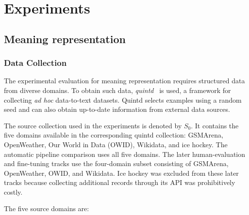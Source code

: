 
\chapter{Experiments}

\section{Meaning representation}

\subsection{Data Collection}

The experimental evaluation for meaning representation requires structured data
from diverse domains. To obtain such data, \emph{quintd}~\cite{kasner2024beyond}
is used, a framework for collecting \emph{ad hoc} data-to-text datasets. 
Quintd selects examples using
a random seed and can also obtain up-to-date information from external data
sources.

The source collection used in the experiments is denoted by $S_0$. It contains
the five domains available in the corresponding quintd collection: GSMArena,
OpenWeather, Our World in Data (OWID), Wikidata, and ice hockey. The automatic
pipeline comparison uses all five domains. The later human-evaluation and
fine-tuning tracks use the four-domain subset consisting of GSMArena,
OpenWeather, OWID, and Wikidata. Ice hockey was excluded from these later tracks
because collecting additional records through its API was prohibitively costly.

The five source domains are:

